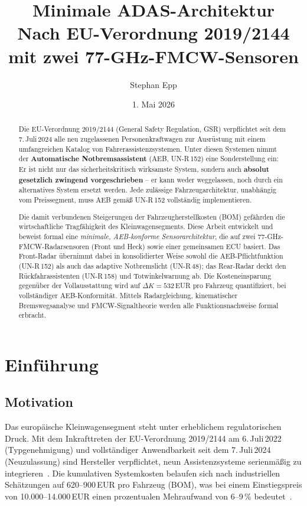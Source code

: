 ﻿\documentclass[a4paper,12pt]{article}
\title{\textbf{Minimale ADAS-Architektur} \\ Nach EU-Verordnung 2019/2144 mit zwei 77-GHz-FMCW-Sensoren}
\author{Stephan Epp}
\date{1. Mai 2026}
\theoremstyle{definition}
\begin{document}
\maketitle

\begin{abstract}
\noindent
Die EU-Verordnung 2019/2144 (General Safety Regulation, GSR) verpflichtet seit
dem 7.\,Juli\,2024 alle neu zugelassenen Personenkraftwagen zur Ausr\"ustung
mit einem umfangreichen Katalog von Fahrerassistenzsystemen. Unter diesen
Systemen nimmt der \textbf{Automatische Notbremsassistent} (AEB, UN-R\,152) eine
Sonderstellung ein: Er ist nicht nur das sicherheitskritisch wirksamste System,
sondern auch \textbf{absolut gesetzlich zwingend vorgeschrieben} -- er kann
weder weggelassen, noch durch ein alternatives System ersetzt werden.
Jede zul\"assige Fahrzeugarchitektur, unabh\"angig vom Preissegment, muss
AEB gem\"a\ss{} UN-R\,152 vollst\"andig implementieren.

Die damit verbundenen Steigerungen der Fahrzeugherstellkosten (BOM) gef\"ahrden
die wirtschaftliche Tragf\"ahigkeit des Kleinwagensegments.
Diese Arbeit entwickelt und beweist formal eine \emph{minimale, AEB-konforme
Sensorarchitektur}, die auf zwei 77-GHz-FMCW-Radarsensoren (Front und Heck)
sowie einer gemeinsamen ECU basiert.
Das Front-Radar \"ubernimmt dabei in konsolidierter Weise sowohl die
AEB-Pflichtfunktion (UN-R\,152) als auch das adaptive Notbremslicht (UN-R\,48);
das Rear-Radar deckt den R\"uckfahrassistenten (UN-R\,158) und
Totwinkelwarnung ab.
Die Kosteneinsparung gegen\"uber der Vollausstattung wird auf
$\Delta K = 532$\,EUR pro Fahrzeug quantifiziert, bei vollst\"andiger
AEB-Konformit\"at. Mittels Radargleichung, kinematischer Bremswegsanalyse
und FMCW-Signaltheorie werden alle Funktionsnachweise formal erbracht.
\end{abstract}

\tableofcontents
\newpage

\section{Einf\"uhrung}

\subsection{Motivation}

Das europ\"aische Kleinwagensegment steht unter erheblichem regulatorischen
Druck. Mit dem Inkrafttreten der EU-Verordnung 2019/2144 am 6.\,Juli\,2022
(Typgenehmigung) und vollst\"andiger Anwendbarkeit seit dem 7.\,Juli\,2024
(Neuzulassung) sind Hersteller verpflichtet, neun Assistenzsysteme
serienm\"a\ss{}ig zu integrieren~\cite{eu2019gsr}. Die kumulativen Systemkosten
belaufen sich nach industriellen Sch\"atzungen auf 620--900\,EUR pro Fahrzeug
(BOM), was bei einem Einstiegspreis von 10.000--14.000\,EUR einen prozentualen
Mehraufwand von 6--9\,\% bedeutet~\cite{adac2023kleinwagen}.
\end{document}
